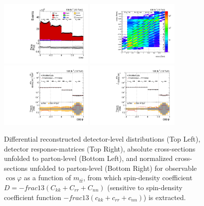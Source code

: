 \clearpage
\begin{figure}[htb]
\begin{center}
 \includegraphics[width=0.40\textwidth]{fig_fullRun2UL/controlplots/combined/Hyp_LLBarcHel_vs_TTBarMass.pdf}
 \includegraphics[width=0.40\textwidth]{fig_fullRun2UL/unfolding/combined/ResponseMatrix_ll_cHel_mttbar.pdf} \\
 \includegraphics[width=0.40\textwidth]{fig_fullRun2UL/unfolding/combined/UnfoldedResults_ll_cHel_mttbar.pdf}
 \includegraphics[width=0.40\textwidth]{fig_fullRun2UL/unfolding/combined/UnfoldedResultsNorm_ll_cHel_mttbar.pdf} \\
\label{fig:ll_cHel_mttbar}
\caption{Differential reconstructed detector-level distributions (Top Left), detector response-matrices (Top Right), absolute cross-sections unfolded to parton-level (Bottom Left), and normalized cross-sections unfolded to parton-level (Bottom Right) for  observable $\cos\varphi$ as a function of $m_{t\bar{t}}$, from which spin-density coefficient $D = -frac{1}{3}(C_{kk} + C_{rr} + C_{nn})$ (sensitive to spin-density coefficient function $-frac{1}{3}(c_{kk} + c_{rr} + c_{nn})$) is extracted.}
\end{center}
\end{figure}
